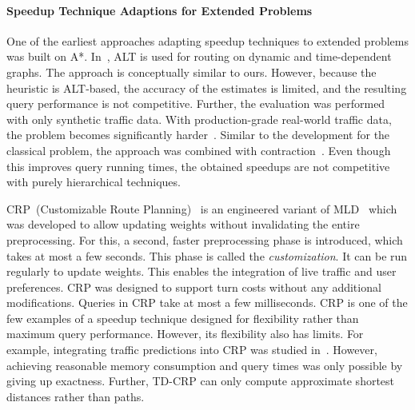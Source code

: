 \documentclass[manuscript]{acmart}
\begin{document}
\paragraph{Speedup Technique Adaptions for Extended Problems}
One of the earliest approaches adapting speedup techniques to extended problems was built on A*.
In~\cite{dw-lbrdg-07}, ALT is used for routing on dynamic and time-dependent graphs.
The approach is conceptually similar to ours.
However, because the heuristic is ALT-based, the accuracy of the estimates is limited, and the resulting query performance is not competitive.
Further, the evaluation was performed with only synthetic traffic data.
With production-grade real-world traffic data, the problem becomes significantly harder~\cite{swz-sfert-21}.
Similar to the development for the classical problem, the approach was combined with contraction~\cite{ndls-bastd-12,dn-crdtd-12}.
Even though this improves query running times, the obtained speedups are not competitive with purely hierarchical techniques.

CRP~(Customizable Route Planning)~\cite{dgpw-crprn-13} is an engineered variant of MLD~\cite{swz-umlgt-02} which was developed to allow updating weights without invalidating the entire preprocessing.
For this, a second, faster preprocessing phase is introduced, which takes at most a few seconds.
This phase is called the \emph{customization}.
It can be run regularly to update weights.
This enables the integration of live traffic and user preferences.
CRP was designed to support turn costs without any additional modifications.
Queries in CRP take at most a few milliseconds.
CRP is one of the few examples of a speedup technique designed for flexibility rather than maximum query performance.
However, its flexibility also has limits.
For example, integrating traffic predictions into CRP was studied in~\cite{bdpw-dtdrp-16}.
However, achieving reasonable memory consumption and query times was only possible by giving up exactness.
Further, TD-CRP can only compute approximate shortest distances rather than paths.
\end{document}
